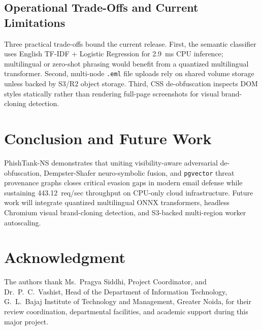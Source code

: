 \documentclass[conference]{IEEEtran}
\begin{document}
\subsection{Operational Trade-Offs and Current Limitations}
Three practical trade-offs bound the current release. First, the semantic classifier uses English TF-IDF + Logistic Regression for 2.9~ms CPU inference; multilingual or zero-shot phrasing would benefit from a quantized multilingual transformer. Second, multi-node \texttt{.eml} file uploads rely on shared volume storage unless backed by S3/R2 object storage. Third, CSS de-obfuscation inspects DOM styles statically rather than rendering full-page screenshots for visual brand-cloning detection.

\section{Conclusion and Future Work}
PhishTank-NS demonstrates that uniting visibility-aware adversarial de-obfuscation, Dempster-Shafer neuro-symbolic fusion, and \texttt{pgvector} threat provenance graphs closes critical evasion gaps in modern email defense while sustaining 443.12~req/sec throughput on CPU-only cloud infrastructure. Future work will integrate quantized multilingual ONNX transformers, headless Chromium visual brand-cloning detection, and S3-backed multi-region worker autoscaling.

\section*{Acknowledgment}
The authors thank Ms.\ Pragya Siddhi, Project Coordinator, and Dr.\ P.\ C.\ Vashist, Head of the Department of Information Technology, G.\ L.\ Bajaj Institute of Technology and Management, Greater Noida, for their review coordination, departmental facilities, and academic support during this major project.



\end{document}
